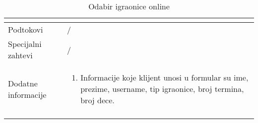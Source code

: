 \documentclass[../../main.tex]{subfiles}
\begin{document}
\begin{longtable}{| p{} | p{} |}
\begin{itemize}
    \end{itemize} \\
\hline
    Podtokovi & /\\
\hline
    Specijalni zahtevi & /\\
\hline
    Dodatne informacije &
    \begin{enumerate}
        \item Informacije koje klijent unosi u formular su ime, prezime, username, tip igraonice, broj termina, broj dece.
    \end{enumerate}\\
\hline
\caption{Odabir igraonice online}
\end{longtable}
\end{document}
